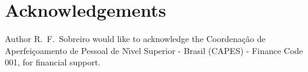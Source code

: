 \documentclass[main.tex]{subfiles}
\begin{document}
\section*{Acknowledgements}
Author R.~F.~Sobreiro would like to acknowledge the Coordena{\c{c}}{\~{a}}o de Aperfei{\c{c}}oamento de Pessoal de N{\'{\i}}vel Superior - Brasil
(CAPES) - Finance Code 001, for financial support.
\end{document}
